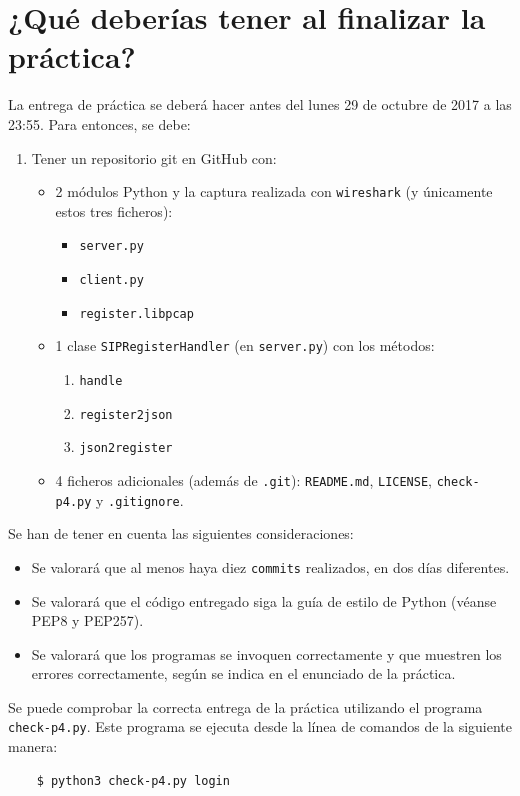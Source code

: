 \documentclass[11pt,a4paper]{article}
\begin{document}
\section{¿Qué deberías tener al finalizar la práctica?}

La entrega de práctica se deberá hacer antes del lunes 29 de octubre de 2017 a las 23:55. Para entonces, se debe: 

\begin{enumerate}
  \item Tener un repositorio git en GitHub con:
  \begin{itemize}
    \item 2 módulos Python y la captura realizada con \texttt{wireshark} (y únicamente estos tres ficheros):
    \begin{itemize}
      \item \texttt{server.py}
      \item \texttt{client.py}
      \item \texttt{register.libpcap}
    \end{itemize}
    \item 1 clase \texttt{SIPRegisterHandler} (en \texttt{server.py}) con los métodos:
    \begin{enumerate}
      \item \texttt{handle}
      \item \texttt{register2json}
      \item \texttt{json2register}
    \end{enumerate}
    \item 4 ficheros adicionales (además de \texttt{.git}): \texttt{README.md}, \texttt{LICENSE}, \texttt{check-p4.py} y \texttt{.gitignore}.
  \end{itemize}
\end{enumerate}

Se han de tener en cuenta las siguientes consideraciones:
\begin{itemize}
  \item Se valorará que al menos haya diez \texttt{commits} realizados, en dos días diferentes.
  \item Se valorará que el código entregado siga la guía de estilo de Python (véanse PEP8 y PEP257).
  \item Se valorará que los programas se invoquen correctamente y que muestren los errores correctamente, según se indica en el enunciado de la práctica.
\end{itemize}

Se puede comprobar la correcta entrega de la práctica utilizando el programa \texttt{check-p4.py}. Este programa se ejecuta desde la línea de comandos de la siguiente manera:
\begin{verbatim}
	$ python3 check-p4.py login
\end{verbatim}
\end{document}
